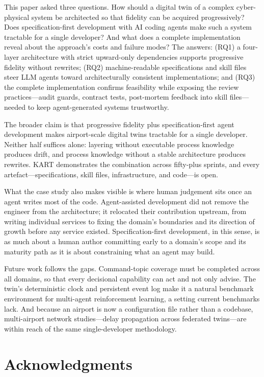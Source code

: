 \documentclass[runningheads]{llncs}
\begin{document}
This paper asked three questions. How should a digital twin of a complex cyber-physical system be architected so that fidelity can be acquired progressively? Does specification-first development with AI coding agents make such a system tractable for a single developer? And what does a complete implementation reveal about the approach's costs and failure modes? The answers: (RQ1) a four-layer architecture with strict upward-only dependencies supports progressive fidelity without rewrites; (RQ2) machine-readable specifications and skill files steer LLM agents toward architecturally consistent implementations; and (RQ3) the complete implementation confirms feasibility while exposing the review practices---audit guards, contract tests, post-mortem feedback into skill files---needed to keep agent-generated systems trustworthy.

The broader claim is that progressive fidelity plus specification-first agent development makes airport-scale digital twins tractable for a single developer. Neither half suffices alone: layering without executable process knowledge produces drift, and process knowledge without a stable architecture produces rewrites. KART demonstrates the combination across fifty-plus sprints, and every artefact---specifications, skill files, infrastructure, and code---is open.

What the case study also makes visible is where human judgement sits once an agent writes most of the code. Agent-assisted development did not remove the engineer from the architecture; it relocated their contribution upstream, from writing individual services to fixing the domain's boundaries and its direction of growth before any service existed. Specification-first development, in this sense, is as much about a human author committing early to a domain's scope and its maturity path as it is about constraining what an agent may build.

Future work follows the gaps. Command-topic coverage must be completed across all domains, so that every decisional capability can act and not only advise. The twin's deterministic clock and persistent event log make it a natural benchmark environment for multi-agent reinforcement learning, a setting current benchmarks lack. And because an airport is now a configuration file rather than a codebase, multi-airport network studies---delay propagation across federated twins---are within reach of the same single-developer methodology.

\section*{Acknowledgments}
\end{document}
